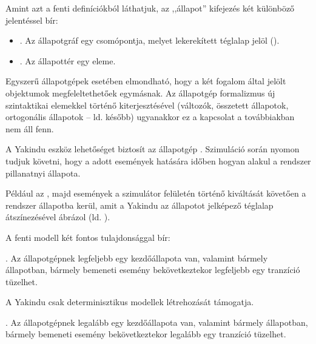 Amint azt a fenti definíciókból láthatjuk, az ,,állapot'' kifejezés két különböző jelentéssel bír:

\begin{itemize}
	\item {}. Az állapotgráf egy csomópontja, melyet lekerekített téglalap jelöl ().
	\item {}. Az állapottér egy eleme.
\end{itemize}

Egyszerű állapotgépek esetében elmondható, hogy a két fogalom által jelölt objektumok megfeleltethetőek egymásnak. Az állapotgép formalizmus új szintaktikai elemekkel történő kiterjesztésével (változók, összetett állapotok, ortogonális állapotok -- ld. később) ugyanakkor ez a kapcsolat a továbbiakban nem áll fenn.


\begin{tipp}
A Yakindu eszköz lehetőséget biztosít az állapotgép . Szimuláció során nyomon tudjuk követni, hogy a adott események hatására időben hogyan alakul a rendszer pillanatnyi állapota.

Például az , majd  események a szimulátor felületén történő kiváltását követően a rendszer  állapotba kerül, amit a Yakindu az állapotot jelképező téglalap átszínezésével ábrázol (ld. ).
\end{tipp}

A fenti modell két fontos tulajdonsággal bír:

\begin{definicio}
	. Az állapotgépnek legfeljebb egy kezdőállapota van, valamint bármely állapotban, bármely bemeneti esemény bekövetkeztekor legfeljebb egy tranzíció tüzelhet.
\end{definicio}

\begin{megjegyzes}
	A Yakindu csak determinisztikus modellek létrehozását támogatja.
\end{megjegyzes}

\begin{definicio}
	. Az állapotgépnek legalább egy kezdőállapota van, valamint bármely állapotban, bármely bemeneti esemény bekövetkeztekor legalább egy tranzíció tüzelhet.
\end{definicio}

